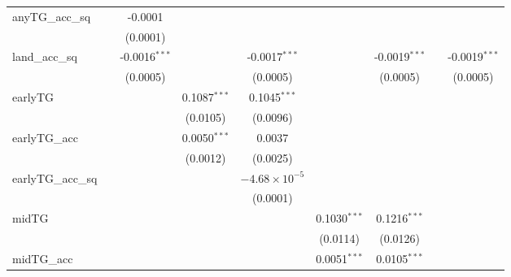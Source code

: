 \documentclass{article}
\begin{document}
\begin{appendices}
\begin{table}[htbp]
\begin{tabular}{lcccccccc}
      anyTG\_acc\_sq     &                 & -0.0001         &                 &                        &                 &                 &                 &   \\   
                         &                 & (0.0001)        &                 &                        &                 &                 &                 &   \\   
      land\_acc\_sq      &                 & -0.0016$^{***}$ &                 & -0.0017$^{***}$        &                 & -0.0019$^{***}$ &                 & -0.0019$^{***}$\\   
                         &                 & (0.0005)        &                 & (0.0005)               &                 & (0.0005)        &                 & (0.0005)\\   
      earlyTG            &                 &                 & 0.1087$^{***}$  & 0.1045$^{***}$         &                 &                 &                 &   \\   
                         &                 &                 & (0.0105)        & (0.0096)               &                 &                 &                 &   \\   
      earlyTG\_acc       &                 &                 & 0.0050$^{***}$  & 0.0037                 &                 &                 &                 &   \\   
                         &                 &                 & (0.0012)        & (0.0025)               &                 &                 &                 &   \\   
      earlyTG\_acc\_sq   &                 &                 &                 & $-4.68\times 10^{-5}$  &                 &                 &                 &   \\   
                         &                 &                 &                 & (0.0001)               &                 &                 &                 &   \\   
      midTG              &                 &                 &                 &                        & 0.1030$^{***}$  & 0.1216$^{***}$  &                 &   \\   
                         &                 &                 &                 &                        & (0.0114)        & (0.0126)        &                 &   \\   
      midTG\_acc         &                 &                 &                 &                        & 0.0051$^{***}$  & 0.0105$^{***}$  &                 &   \\   

\end{tabular}
\end{table}
\end{appendices}
\end{document}
